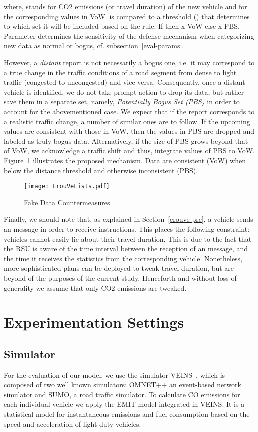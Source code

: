 \documentclass[conference]{IEEEtran}
\begin{document}
where,  stands for  CO2 emissions (or travel duration) of the new vehicle and  for the corresponding  values in VoW.
 is compared to a threshold () that determines to which set it will be included based on the rule:
If  then x  VoW else x  PBS. Parameter  determines the sensitivity of the defense mechanism when categorizing new data as normal or bogus, cf. subsection~\ref{eval-params}. 


However, a {\it distant} report is not necessarily a bogus one, i.e. it may correspond to a true change in the traffic conditions of a road segment from dense
to light traffic (congested to uncongested) and vice versa. Consequently, once a distant vehicle is identified, we do not take prompt action to drop its data, but rather save them in a separate set, namely, {\it Potentially Bogus Set (PBS)}
in order to account for the abovementioned case. We expect that if the report corresponds to a realistic traffic change, a number of similar ones are to follow. If the upcoming values are consistent with those in VoW, then the values in PBS are dropped and labeled as truly bogus
data. Alternatively, if the size of PBS 
grows beyond that of VoW, we acknowledge a traffic shift and thus, integrate values of  PBS to VoW. Figure~\ref{shift-lists} illustrates the proposed mechanism. Data are consistent (VoW) when below the distance threshold and otherwise inconsistent (PBS).
\begin{figure}[!htb]
  \centering
     \texttt{[image: ErouVeLists.pdf]}
  \caption{Fake Data Countermeasures}
  \label{shift-lists}
\end{figure}

Finally, we should note that, as explained in Section~\ref{erouve-pre}, a vehicle sends an  message in order to 
receive instructions. This places the following constraint: vehicles cannot easily lie about their travel duration. This is due to the fact that the RSU
is aware of the time interval between the reception of an  message, and the time it receives the statistics from the corresponding vehicle. Nonetheless, more sophisticated plans can be deployed to tweak travel duration, but are beyond of the purposes of the current study. Henceforth and without loss of generality we assume that only CO2 emissions are tweaked.

\section{Experimentation Settings}

\subsection{Simulator}
For the evaluation of our model, we use the simulator VEINS~\cite{sommer2011bidirectionally}, which is composed of two well known simulators: OMNET++ an event-based network
simulator and SUMO, a road traffic simulator. To calculate CO emissions for each individual vehicle we apply the EMIT model integrated in VEINS.
It is a statistical model  for instantaneous emissions and fuel consumption based on the speed and acceleration of light-duty vehicles. 
\end{document}
